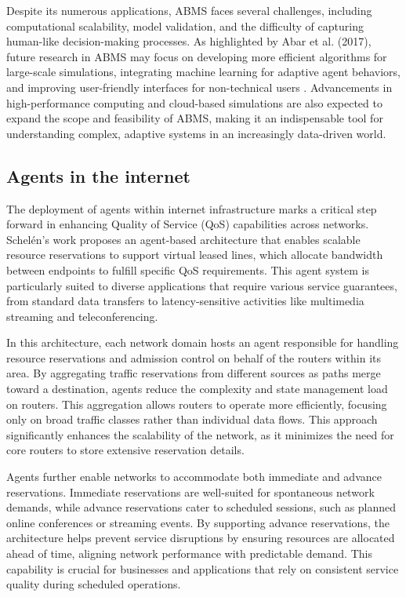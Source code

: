 Despite its numerous applications, ABMS faces several challenges, including computational scalability, model validation, and the difficulty of capturing human-like decision-making processes. As highlighted by Abar et al. (2017), future research in ABMS may focus on developing more efficient algorithms for large-scale simulations, integrating machine learning for adaptive agent behaviors, and improving user-friendly interfaces for non-technical users \cite{3}. Advancements in high-performance computing and cloud-based simulations are also expected to expand the scope and feasibility of ABMS, making it an indispensable tool for understanding complex, adaptive systems in an increasingly data-driven world.

\subsection{Agents in the internet}
The deployment of agents within internet infrastructure marks a critical step forward in enhancing Quality of Service (QoS) capabilities across networks. Schelén's work \cite{5} proposes an agent-based architecture that enables scalable resource reservations to support virtual leased lines, which allocate bandwidth between endpoints to fulfill specific QoS requirements. This agent system is particularly suited to diverse applications that require various service guarantees, from standard data transfers to latency-sensitive activities like multimedia streaming and teleconferencing.

In this architecture, each network domain hosts an agent responsible for handling resource reservations and admission control on behalf of the routers within its area. By aggregating traffic reservations from different sources as paths merge toward a destination, agents reduce the complexity and state management load on routers. This aggregation allows routers to operate more efficiently, focusing only on broad traffic classes rather than individual data flows. This approach significantly enhances the scalability of the network, as it minimizes the need for core routers to store extensive reservation details.

Agents further enable networks to accommodate both immediate and advance reservations. Immediate reservations are well-suited for spontaneous network demands, while advance reservations cater to scheduled sessions, such as planned online conferences or streaming events. By supporting advance reservations, the architecture helps prevent service disruptions by ensuring resources are allocated ahead of time, aligning network performance with predictable demand. This capability is crucial for businesses and applications that rely on consistent service quality during scheduled operations.

